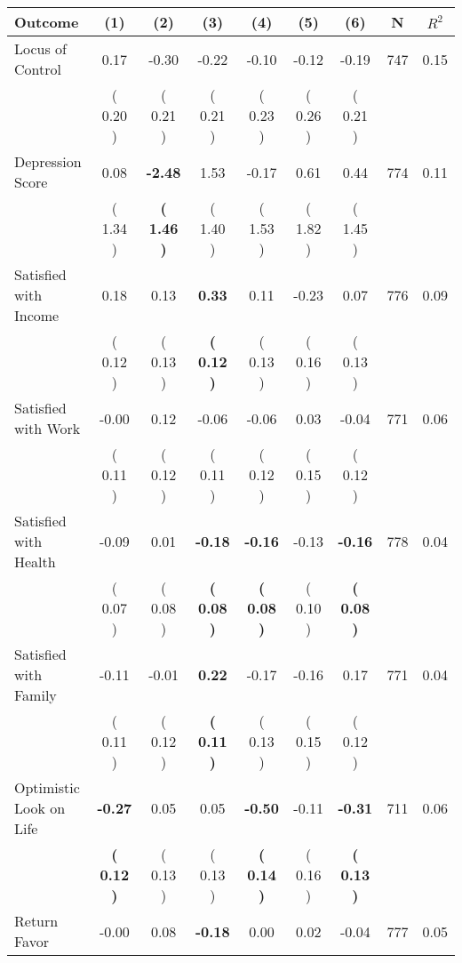 \begin{tabular}{lcccccccc}
\toprule
 \textbf{Outcome} & \textbf{(1)} & \textbf{(2)} & \textbf{(3)} & \textbf{(4)} & \textbf{(5)} & \textbf{(6)} & \textbf{N} & \textbf{$ R^2$} \\
\midrule
Locus of Control &      0.17 &     -0.30 &     -0.22 &     -0.10 &     -0.12 &     -0.19 & 747 &       0.15 \\ 
 & (     0.20 ) & (     0.21 ) & (     0.21 ) & (     0.23 ) & (     0.26 ) & (     0.21 ) & \\
Depression Score &      0.08 & \textbf{    -2.48} &      1.53 &     -0.17 &      0.61 &      0.44 & 774 &       0.11 \\ 
 & (     1.34 ) & \textbf{(     1.46 )} & (     1.40 ) & (     1.53 ) & (     1.82 ) & (     1.45 ) & \\
Satisfied with Income &      0.18 &      0.13 & \textbf{     0.33} &      0.11 &     -0.23 &      0.07 & 776 &       0.09 \\ 
 & (     0.12 ) & (     0.13 ) & \textbf{(     0.12 )} & (     0.13 ) & (     0.16 ) & (     0.13 ) & \\
Satisfied with Work &     -0.00 &      0.12 &     -0.06 &     -0.06 &      0.03 &     -0.04 & 771 &       0.06 \\ 
 & (     0.11 ) & (     0.12 ) & (     0.11 ) & (     0.12 ) & (     0.15 ) & (     0.12 ) & \\
Satisfied with Health &     -0.09 &      0.01 & \textbf{    -0.18} & \textbf{    -0.16} &     -0.13 & \textbf{    -0.16} & 778 &       0.04 \\ 
 & (     0.07 ) & (     0.08 ) & \textbf{(     0.08 )} & \textbf{(     0.08 )} & (     0.10 ) & \textbf{(     0.08 )} & \\
Satisfied with Family &     -0.11 &     -0.01 & \textbf{     0.22} &     -0.17 &     -0.16 &      0.17 & 771 &       0.04 \\ 
 & (     0.11 ) & (     0.12 ) & \textbf{(     0.11 )} & (     0.13 ) & (     0.15 ) & (     0.12 ) & \\
Optimistic Look on Life & \textbf{    -0.27} &      0.05 &      0.05 & \textbf{    -0.50} &     -0.11 & \textbf{    -0.31} & 711 &       0.06 \\ 
 & \textbf{(     0.12 )} & (     0.13 ) & (     0.13 ) & \textbf{(     0.14 )} & (     0.16 ) & \textbf{(     0.13 )} & \\
Return Favor &     -0.00 &      0.08 & \textbf{    -0.18} &      0.00 &      0.02 &     -0.04 & 777 &       0.05 \\ 

\end{tabular}
